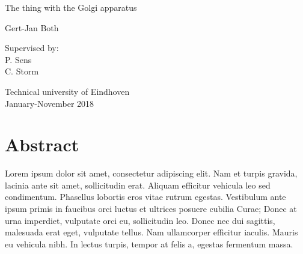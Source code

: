 \documentclass[12pt,a4paper,]{harvard-thesis}
\date{}
\begin{document}
\begin{titlepage}
    \begin{center}

        
        \vspace*{2.5cm}
        
        \huge
        The thing with the Golgi apparatus
        
        \vspace{1.5cm}
        
        \Large
        Gert-Jan Both

        \vspace{1.5cm}

        
        \vfill
        
        \normalsize
        Supervised by:\\
        P. Sens\\
        C. Storm

        \vspace{0.8cm}

        
        \normalsize
        Technical university of Eindhoven\\
        January-November 2018


    \end{center}
\end{titlepage}

\hypertarget{abstract}{%
\chapter*{Abstract}\label{abstract}}

Lorem ipsum dolor sit amet, consectetur adipiscing elit. Nam et turpis
gravida, lacinia ante sit amet, sollicitudin erat. Aliquam efficitur
vehicula leo sed condimentum. Phasellus lobortis eros vitae rutrum
egestas. Vestibulum ante ipsum primis in faucibus orci luctus et
ultrices posuere cubilia Curae; Donec at urna imperdiet, vulputate orci
eu, sollicitudin leo. Donec nec dui sagittis, malesuada erat eget,
vulputate tellus. Nam ullamcorper efficitur iaculis. Mauris eu vehicula
nibh. In lectus turpis, tempor at felis a, egestas fermentum massa.
\end{document}
